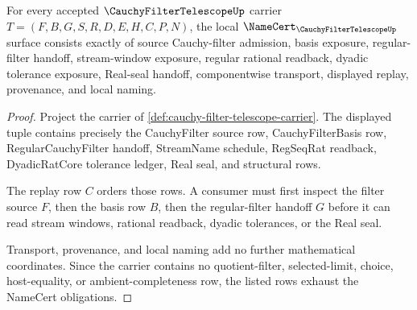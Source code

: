 \begin{theorem}
\label{thm:cauchy-filter-telescope-namecert-obligations}
For every accepted $\CauchyFilterTelescopeUp$ carrier $T=(F,B,G,S,R,D,E,H,C,P,N)$, the local $\NameCert_{\CauchyFilterTelescopeUp}$ surface consists exactly of source Cauchy-filter admission, basis exposure, regular-filter handoff, stream-window exposure, regular rational readback, dyadic tolerance exposure, Real-seal handoff, componentwise transport, displayed replay, provenance, and local naming.
\end{theorem}
\begin{proof}
Project the carrier of \autoref{def:cauchy-filter-telescope-carrier}. The displayed tuple contains precisely the CauchyFilter source row, CauchyFilterBasis row, RegularCauchyFilter handoff, StreamName schedule, RegSeqRat readback, DyadicRatCore tolerance ledger, Real seal, and structural rows.

The replay row $C$ orders those rows. A consumer must first inspect the filter source $F$, then the basis row $B$, then the regular-filter handoff $G$ before it can read stream windows, rational readback, dyadic tolerances, or the Real seal.

Transport, provenance, and local naming add no further mathematical coordinates. Since the carrier contains no quotient-filter, selected-limit, choice, host-equality, or ambient-completeness row, the listed rows exhaust the NameCert obligations.
\end{proof}


